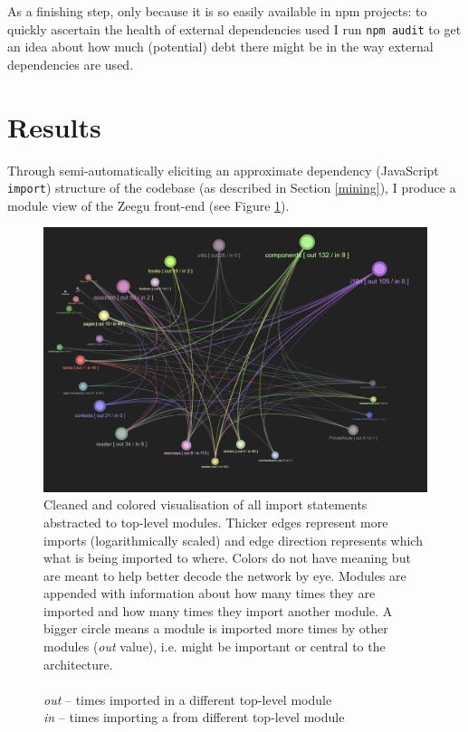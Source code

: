 \documentclass{article}
\begin{document}
As a finishing step, only because it is so easily available in npm projects:
to quickly ascertain the health of external dependencies used I run \verb|npm audit|
to get an idea about how much (potential) debt there might be in the way external dependencies are used.



\section{Results}

Through semi-automatically eliciting an approximate dependency (JavaScript \verb|import|) structure of the codebase
(as described in Section \ref{mining}),
I produce a module view of the Zeegu front-end (see Figure \ref{fig:3:clean}).

\begin{figure}[h]
  \centering 
  \includegraphics[width=\textwidth]{graphics/module_abstraction_cleaned.png}
  \caption{Cleaned and colored visualisation of all import statements abstracted to top-level modules. 
  Thicker edges represent more imports (logarithmically scaled) and edge 
  direction represents which what is being imported to where.
  Colors do not have meaning but are meant to help better decode the network by eye.
  Modules are appended with information about how many times they are imported and how many times they import another module.
  A bigger circle means a module is imported more times by other modules (\textit{out} value),
  i.e. might be important or central to the architecture. \\ \vspace*{.25em} \\
  \hspace*{2em}\textit{out} -- times imported in a different top-level module \\
  \hspace*{2em}\textit{in} -- times importing a from different top-level module}
  \label{fig:3:clean}
\end{figure}
\end{document}
